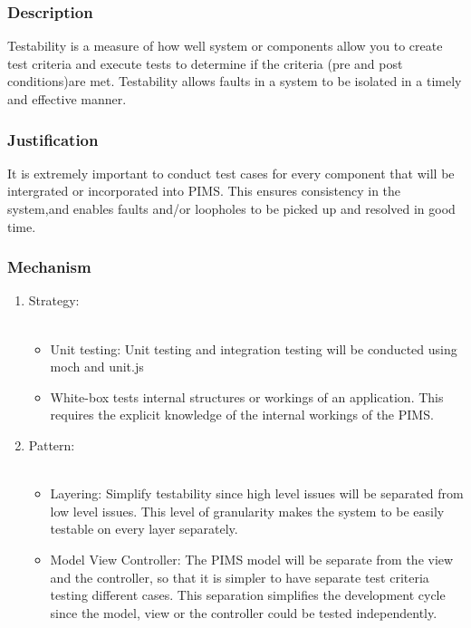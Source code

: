 	\subsubsection*{Description}
		Testability is a measure of how well system or components allow you to create test criteria and execute tests to determine if the criteria (pre and post conditions)are met. Testability allows faults in a system to be isolated in a timely and effective manner.
		
		
	\subsubsection*{Justification}
	It is extremely important to conduct test cases for every component that will be intergrated or incorporated into PIMS. This ensures consistency in the system,and enables faults and/or loopholes to be picked up and resolved in good time.
	
	\subsubsection*{Mechanism}
		\begin{enumerate}
			\item Strategy:\\\\
		\begin{itemize}
			\item Unit testing: Unit testing and integration testing will be conducted using moch and unit.js
			\item	White-box tests internal structures or workings of an application. This requires the explicit knowledge of the internal workings of the PIMS.
		\end{itemize}
		
		
			 \item Pattern:\\\\
		 \begin{itemize}
			\item	Layering:  Simplify testability since high level issues will be separated from low level issues. This level of granularity makes the system to be easily testable on every layer separately.
			\item Model View Controller: The PIMS model will be separate from the view and the controller, so that it is simpler to have separate test criteria testing different cases. This separation simplifies the development cycle since the model, view or the controller could be tested independently. 
		\end{itemize}
\end{enumerate}